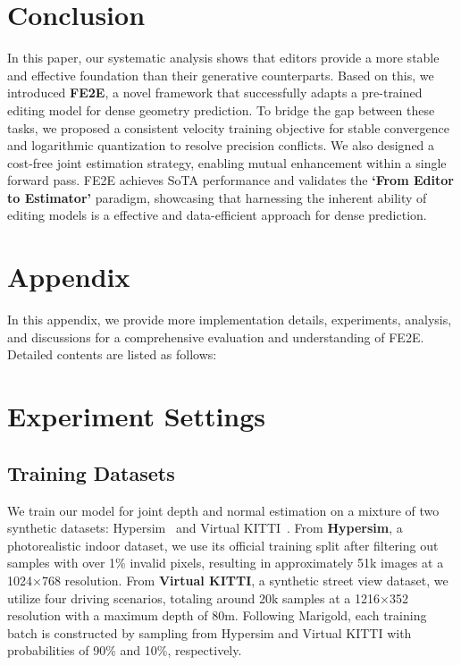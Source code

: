 \documentclass{article} %
\begin{document}
\section{Conclusion}
\vspace{-0.5em}
In this paper, our systematic analysis shows that editors provide a more stable and effective foundation than their generative counterparts. Based on this, we introduced \textbf{FE2E}, a novel framework that successfully adapts a pre-trained editing model for dense geometry prediction. To bridge the gap between these tasks, we proposed a consistent velocity training objective for stable convergence and logarithmic quantization to resolve precision conflicts. We also designed a cost-free joint estimation strategy, enabling mutual enhancement within a single forward pass. FE2E achieves SoTA performance and validates the \textbf{`From Editor to Estimator'} paradigm, showcasing that harnessing the inherent ability of editing models is a effective and data-efficient approach for dense prediction.

\appendix
\section*{Appendix}
In this appendix, we provide more implementation details, experiments, analysis, and discussions for a comprehensive evaluation and understanding of FE2E. Detailed contents are listed as follows:

\setlength{\cftbeforesecskip}{0.5em}
{
  \etocsettocstyle{}{}
  \localtableofcontents
}


\section{Experiment Settings}

\subsection{Training Datasets} 
\label{supp:traindata}
We train our model for joint depth and normal estimation on a mixture of two synthetic datasets: Hypersim~\citep{hypersim} and Virtual KITTI~\citep{vkitti}. 
From \textbf{Hypersim}, a photorealistic indoor dataset, we use its official training split after filtering out samples with over 1\% invalid pixels, resulting in approximately 51k images at a 1024$\times$768 resolution. 
From \textbf{Virtual KITTI}, a synthetic street view dataset, we utilize four driving scenarios, totaling around 20k samples at a 1216$\times$352 resolution with a maximum depth of 80m. 
Following Marigold, each training batch is constructed by sampling from Hypersim and Virtual KITTI with probabilities of 90\% and 10\%, respectively. 
\end{document}
